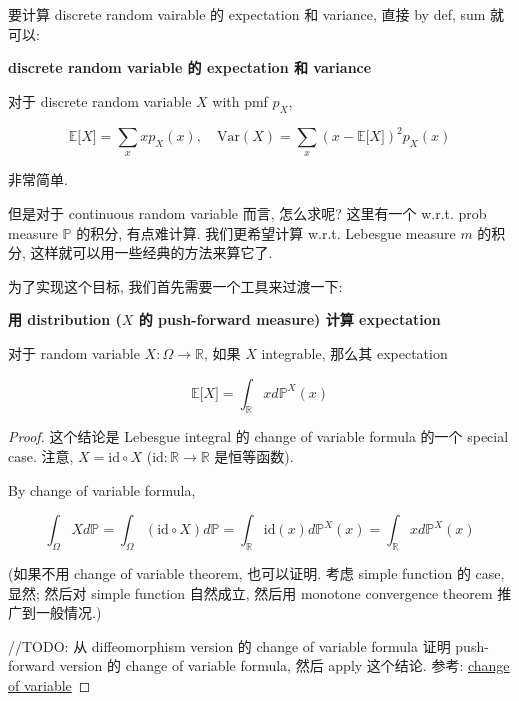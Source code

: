 \documentclass{qlnotes-export}
\begin{document}
要计算 discrete random vairable 的 expectation 和 variance, 直接 by def, sum 就可以:

\begin{proposition}{\protect{}\label{kn-discrete-random-variable-expectation-variance}{\textbf{discrete
random variable 的 expectation 和 variance}}}

对于 discrete random variable \(X\) with pmf \(p_{X}\),

\[{\mathbb{E}}\lbrack X\rbrack = \sum\limits_{x}xp_{X}(x),\quad\text{Var}(X) = \sum\limits_{x}(x - {\mathbb{E}}\lbrack X\rbrack)^{2}p_{X}(x)\]

\end{proposition}

非常简单.

但是对于 continuous random variable 而言, 怎么求呢? 这里有一个 w.r.t. prob measure \(\mathbb{P}\) 的积分, 有点难计算. 我们更希望计算 w.r.t. Lebesgue measure \(m\) 的积分, 这样就可以用一些经典的方法来算它了.

为了实现这个目标, 我们首先需要一个工具来过渡一下:

\begin{lemma}{\protect{}\label{kn-distribution-x-push-forward-measure-expectation}{\textbf{用
distribution (\(X\) 的 push-forward measure) 计算 expectation}}}

对于 random variable \(X:\Omega\rightarrow{\mathbb{R}}\), 如果 \(X\) integrable, 那么其 expectation

\[{\mathbb{E}}\lbrack X\rbrack = \int_{\mathbb{R}}x d{\mathbb{P}}^{X}(x)\]

\end{lemma}

\begin{proof}

这个结论是 Lebesgue integral 的 change of variable formula 的一个 special case. 注意, \(X = \text{id} \circ X\) (\(\text{id}:{\mathbb{R}}\rightarrow{\mathbb{R}}\) 是恒等函数).

By change of variable formula,

\[\int_{\Omega}X d{\mathbb{P}} = \int_{\Omega}(\text{id} \circ X) d{\mathbb{P}} = \int_{\mathbb{R}}\text{id}(x) d{\mathbb{P}}^{X}(x) = \int_{\mathbb{R}}x d{\mathbb{P}}^{X}(x)\]

(如果不用 change of variable theorem, 也可以证明. 考虑 simple function 的 case, 显然; 然后对 simple function 自然成立, 然后用 monotone convergence theorem 推广到一般情况.)

//TODO: 从 diffeomorphism version 的 change of variable formula 证明 push-forward version 的 change of variable formula, 然后 apply 这个结论. 参考: \href{https://en.wikipedia.org/wiki/Change_of_variables}{change of variable}

\end{proof}
\end{document}
